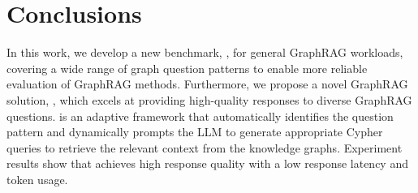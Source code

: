 \vspace{-2mm}
\section{Conclusions}\label{sec:conclusion}



In this work, we develop a new benchmark, \benchmarkname{}, for general GraphRAG workloads, covering a wide range of graph question patterns to enable more reliable evaluation of GraphRAG methods. Furthermore, we propose a novel GraphRAG solution, \name{}, which excels at providing high-quality responses to diverse GraphRAG questions. \name{} is an adaptive framework that automatically identifies the question pattern and dynamically prompts the LLM to generate appropriate Cypher queries to retrieve the relevant context from the knowledge graphs. Experiment results show that \name{} achieves high response quality with a low response latency and token usage.
